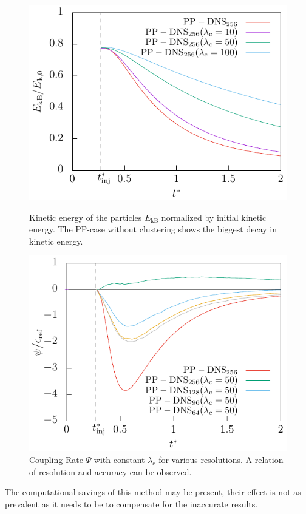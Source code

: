 \documentclass[11pt,a4paper,openany,oneside,parskip=half*]{article}
\begin{document}
\begin{figure}[h]
    \centering
    \begin{minipage}[t]{.5\textwidth}
         \centering
        \includegraphics[width=\linewidth]{./Abbildungen/256/particlekineticenergy_time.pdf}
        \caption{Kinetic energy of the particles $E_\mathrm{kB}$ normalized by initial kinetic energy. The PP-case without clustering shows the biggest decay in kinetic energy. }
        \label{particlekineticenergy_time_256}
    \end{minipage}%
    \begin{minipage}[t]{0.5\textwidth}
        \centering
        \includegraphics[width=\linewidth]{./Abbildungen/vergleich_coupling_time.pdf}
        \caption{Coupling Rate $\Psi$ with constant $\lambda_\mathrm{c}$ for various resolutions. A relation of resolution and accuracy can be observed.}
        \label{vergleich_coupling_time_256}
    \end{minipage}
\end{figure}
\newline
The computational savings of this method may be present, their effect is not as prevalent as it needs to be to compensate for the inaccurate results.
\pagebreak
\end{document}
